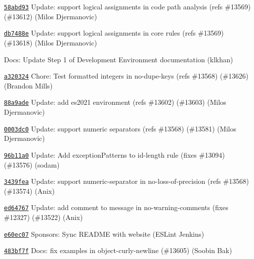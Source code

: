 \begin{DoxyItemize}
\item \href{https://github.com/eslint/eslint/commit/58abd9311900a8af5a3c0963daaf64675bdd8383}{\texttt{ {\ttfamily 58abd93}}} Update\+: support logical assignments in code path analysis (refs \#13569) (\#13612) (Milos Djermanovic)
\item \href{https://github.com/eslint/eslint/commit/db7488e6326fd1b7ea04c5062beb1c5f75fc15ed}{\texttt{ {\ttfamily db7488e}}} Update\+: support logical assignments in core rules (refs \#13569) (\#13618) (Milos Djermanovic)
\item \href{https://github.com/eslint/eslint/commit/372921924778f2e525535985e17c97b988546210}{\texttt{ {}}} Docs\+: Update Step 1 of Development Environment documentation (klkhan)
\item \href{https://github.com/eslint/eslint/commit/a32032430a0779a4e3b2d137d4d0682844084b82}{\texttt{ {\ttfamily a320324}}} Chore\+: Test formatted integers in no-\/dupe-\/keys (refs \#13568) (\#13626) (Brandon Mills)
\item \href{https://github.com/eslint/eslint/commit/88a9ade7643bb166efbab45cee15f3269496f4be}{\texttt{ {\ttfamily 88a9ade}}} Update\+: add es2021 environment (refs \#13602) (\#13603) (Milos Djermanovic)
\item \href{https://github.com/eslint/eslint/commit/0003dc0f966f2b47555595586f84eb3163cb0179}{\texttt{ {\ttfamily 0003dc0}}} Update\+: support numeric separators (refs \#13568) (\#13581) (Milos Djermanovic)
\item \href{https://github.com/eslint/eslint/commit/96b11a0717bf32b94ec768611574372320fb774b}{\texttt{ {\ttfamily 96b11a0}}} Update\+: Add exception\+Patterns to id-\/length rule (fixes \#13094) (\#13576) (sodam)
\item \href{https://github.com/eslint/eslint/commit/3439fea5c0ed330d01d874b0c9df51dd51ae792c}{\texttt{ {\ttfamily 3439fea}}} Update\+: support numeric-\/separator in no-\/loss-\/of-\/precision (refs \#13568) (\#13574) (Anix)
\item \href{https://github.com/eslint/eslint/commit/ed64767859d776145d68145419a61f5379b4dd63}{\texttt{ {\ttfamily ed64767}}} Update\+: add comment to message in no-\/warning-\/comments (fixes \#12327) (\#13522) (Anix)
\item \href{https://github.com/eslint/eslint/commit/e60ec07fad0c1d4c966f28d214c5379da753ff4e}{\texttt{ {\ttfamily e60ec07}}} Sponsors\+: Sync README with website (ESLint Jenkins)
\item \href{https://github.com/eslint/eslint/commit/483bf7f3cc40e0d866798d6ca9ee1c19aa77ddd2}{\texttt{ {\ttfamily 483bf7f}}} Docs\+: fix examples in object-\/curly-\/newline (\#13605) (Soobin Bak)

\end{DoxyItemize}
